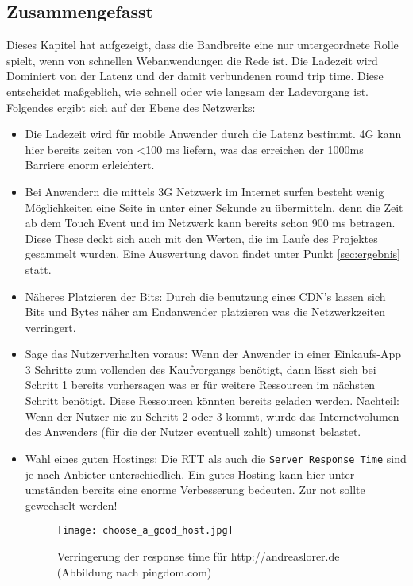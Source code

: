 	\subsection{Zusammengefasst} %
	\label{sub:zusammengefasst}
		Dieses Kapitel hat aufgezeigt, dass die Bandbreite eine nur untergeordnete Rolle spielt, wenn von schnellen Webanwendungen die Rede ist. Die Ladezeit wird Dominiert von der Latenz und der damit verbundenen round trip time. Diese entscheidet maßgeblich, wie schnell oder wie langsam der Ladevorgang ist.
		Folgendes ergibt sich auf der Ebene des Netzwerks:
		\begin{itemize}
			\item Die Ladezeit wird für mobile Anwender durch die Latenz bestimmt. 4G kann hier bereits zeiten von <100 ms liefern, was das erreichen der 1000ms Barriere enorm erleichtert.
			\item Bei Anwendern die mittels 3G Netzwerk im Internet surfen besteht wenig Möglichkeiten eine Seite in unter einer Sekunde zu übermitteln, denn die Zeit ab dem Touch Event und im Netzwerk kann bereits schon 900 ms betragen. Diese These deckt sich auch mit den Werten, die im Laufe des Projektes gesammelt wurden. Eine Auswertung davon findet unter Punkt \ref{sec:ergebnis} statt.
			\item Näheres Platzieren der Bits: Durch die benutzung eines CDN's lassen sich Bits und Bytes näher am Endanwender platzieren was die Netzwerkzeiten verringert.
			\item Sage das Nutzerverhalten voraus: Wenn der Anwender in einer Einkaufs-App 3 Schritte zum vollenden des Kaufvorgangs benötigt, dann lässt sich bei Schritt 1 bereits vorhersagen was er für weitere Ressourcen im nächsten Schritt benötigt. Diese Ressourcen könnten bereits geladen werden. Nachteil: Wenn der Nutzer nie zu Schritt 2 oder 3 kommt, wurde das Internetvolumen des Anwenders (für die der Nutzer eventuell zahlt) umsonst belastet.
			\item Wahl eines guten Hostings: Die RTT als auch die \texttt{Server Response Time} sind je nach Anbieter unterschiedlich. Ein gutes Hosting kann hier unter umständen bereits eine enorme Verbesserung bedeuten. Zur not sollte gewechselt werden!

			\begin{figure}[htbp]
				\begin{center}
					\texttt{[image: choose\_a\_good\_host.jpg]}
					\caption{Verringerung der response time für http://andreaslorer.de (Abbildung nach pingdom.com)}
					\label{fig:choose_a_good_host}
				\end{center}
			\end{figure}
			

\end{itemize}
